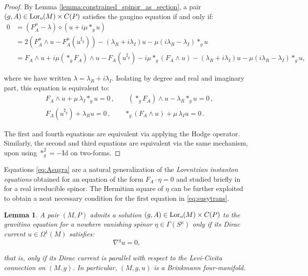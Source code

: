 \documentclass[10pt,a4paper,twoside,reqno]{amsart}
\theoremstyle{plain}
\newtheorem{lemma}[thm]{Lemma}
\theoremstyle{definition}
\theoremstyle{remark}
\def\Id{\mathrm{Id}}
\newcommand{\Lor}{{\rm Lor}}
\begin{document}
\begin{proof}
By Lemma \ref{lemma:constrained_spinor_as_section}, a pair $(g,A)\in \Lor_o(M)\times C(P)$ satisfies the gaugino equation if and only if:
\begin{align*}
0 &= (F^{\mu}_A -  \lambda) \diamond (u + i \mu \ast_g u)\\
&= 2 (F^{\mu}_A \wedge u - F_A^{\mu}(u^{\sharp_g})) - (\lambda_R + i \lambda_I) u - \mu (i \lambda_R - \lambda_I) \ast_g u\\
&= F_A\wedge u + i \mu (\ast_g F_A) \wedge u - F_A(u^{\sharp_g}) - i \mu \ast_g (F_A\wedge u)- (\lambda_R + i \lambda_I) u - \mu (i \lambda_R - \lambda_I) \ast_g u,
\end{align*}

\noindent
where we have written $\lambda = \lambda_R + i\lambda_I$. Isolating by degree and real and imaginary part, this equation is equivalent to:
\begin{eqnarray*}
& F_A\wedge u + \mu\,  \lambda_I \ast_g u = 0\, , \qquad (\ast_g F_A)\wedge u - \lambda_R \ast_g u = 0\, ,\\
& F_A(u^{\sharp_g}) + \lambda_R u =  0\, , \qquad \ast_g(F_A\wedge u) + \mu\, \lambda_I u = 0\, .
\end{eqnarray*}

\noindent
The first and fourth equations are equivalent via applying the Hodge operator. Similarly, the second and third equations are equivalent via the same mechanism, upon using $\ast_g^2 = -\Id$ on two-forms.
\end{proof}

\noindent
Equations \eqref{eq:Asugra} are a natural generalization of the \emph{Lorentzian instanton equations} obtained for an equation of the form $F_A\cdot \eta = 0$ and studied briefly in \cite{ShahbaziThesis} for a real irreducible spinor. The Hermitian square of $\eta$ can be further exploited to obtain a neat necessary condition for the first equation in \eqref{eq:susytrans}.

\begin{lemma}
A pair $(M,P)$ admits a solution $(g,A)\in \Lor_o(M)\times C(P)$ to the gravitino equation for a nowhere vanishing spinor $\eta\in \Gamma(S^{\mu})$ only if its Dirac current $u\in \Omega^1(M)$ satisfies:
\begin{equation}
\label{eq:nablasugra}
\nabla^g u = 0,
\end{equation}

that is, only if its Dirac current is parallel with respect to the Levi-Civita connection on $(M,g)$. In particular, $(M,g,u)$ is a Brinkmann four-manifold. 
\end{lemma}
\end{document}
